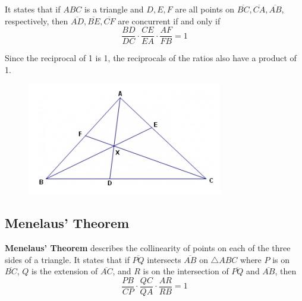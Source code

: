\documentclass{article}
\begin{document}
            \noindent It states that if $ABC$ is a triangle and $D,E,F$ are all points on
            $\overline{BC},\overline{CA},\overline{AB}$, respectively, then $\overline{AD},
            \overline{BE},\overline{CF}$ are concurrent if and only if \\

            \begin{equation*}
                \frac{BD}{DC}\cdot\frac{CE}{EA}\cdot\frac{AF}{FB}=1
            \end{equation*}

            \noindent Since the reciprocal of 1 is 1, the reciprocals of the ratios also have a
            product of 1. \\

            \begin{figure} [hbt!]
                \centering
                \includegraphics[scale=0.75]{Resources/Unit2Triangles/ceva.PNG}
            \end{figure}

        \pagebreak
        \subsection{Menelaus' Theorem}
            \color{purple} \textbf{Menelaus' Theorem} \color{black} describes the collinearity of
            points on each of the three sides of a triangle. It states that if $\overline{PQ}$
            intersects $\overline{AB}$ on $\triangle ABC$ where $P$ is on $\overline{BC}$, $Q$ is
            the extension of $\overline{AC}$, and $R$ is on the intersection of $\overline{PQ}$ and
            $\overline{AB}$, then \\

            \begin{equation*}
                \frac{PB}{CP}\cdot\frac{QC}{QA}\cdot\frac{AR}{RB}=1
            \end{equation*}
\end{document}
